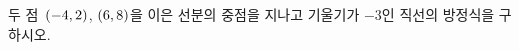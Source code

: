 두 점~$(-4{,}\mkern3mu\mathopen{}2)$, $(6{,}\mkern3mu\mathopen{}8)$을 이은 선분의 중점을 지나고 기울기가 $-3$인 직선의 방정식을 구하시오.
